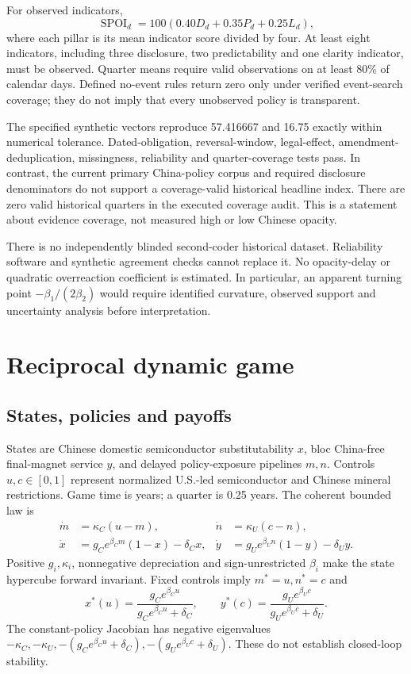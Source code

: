 \documentclass[11pt]{article}
\begin{document}
For observed indicators,
\begin{equation}
 \operatorname{SPOI}_d=100(0.40D_d+0.35P_d+0.25L_d),
\end{equation}
where each pillar is its mean indicator score divided by four. At least eight indicators, including three disclosure, two predictability and one clarity indicator, must be observed. Quarter means require valid observations on at least 80\% of calendar days. Defined no-event rules return zero only under verified event-search coverage; they do not imply that every unobserved policy is transparent.

The specified synthetic vectors reproduce 57.416667 and 16.75 exactly within numerical tolerance. Dated-obligation, reversal-window, legal-effect, amendment-deduplication, missingness, reliability and quarter-coverage tests pass. In contrast, the current primary China-policy corpus and required disclosure denominators do not support a coverage-valid historical headline index. There are zero valid historical quarters in the executed coverage audit. This is a statement about evidence coverage, not measured high or low Chinese opacity.

There is no independently blinded second-coder historical dataset. Reliability software and synthetic agreement checks cannot replace it. No opacity-delay or quadratic overreaction coefficient is estimated. In particular, an apparent turning point $-\beta_1/(2\beta_2)$ would require identified curvature, observed support and uncertainty analysis before interpretation.

\section{Reciprocal dynamic game}
\subsection{States, policies and payoffs}
States are Chinese domestic semiconductor substitutability $x$, bloc China-free final-magnet service $y$, and delayed policy-exposure pipelines $m,n$. Controls $u,c\in[0,1]$ represent normalized U.S.-led semiconductor and Chinese mineral restrictions. Game time is years; a quarter is 0.25 years. The coherent bounded law is
\begin{align}
 \dot m&=\kappa_C(u-m),&\dot n&=\kappa_U(c-n),\\
 \dot x&=g_Ce^{\beta_Cm}(1-x)-\delta_Cx,&
 \dot y&=g_Ue^{\beta_Un}(1-y)-\delta_Uy.
\end{align}
Positive $g_i,\kappa_i$, nonnegative depreciation and sign-unrestricted $\beta_i$ make the state hypercube forward invariant. Fixed controls imply $m^*=u,n^*=c$ and
\begin{equation}
 x^*(u)=\frac{g_Ce^{\beta_Cu}}{g_Ce^{\beta_Cu}+\delta_C},\qquad
 y^*(c)=\frac{g_Ue^{\beta_Uc}}{g_Ue^{\beta_Uc}+\delta_U}.
\end{equation}
The constant-policy Jacobian has negative eigenvalues $-\kappa_C,-\kappa_U,-(g_Ce^{\beta_Cu}+\delta_C),-(g_Ue^{\beta_Uc}+\delta_U)$. These do not establish closed-loop stability.
\end{document}
